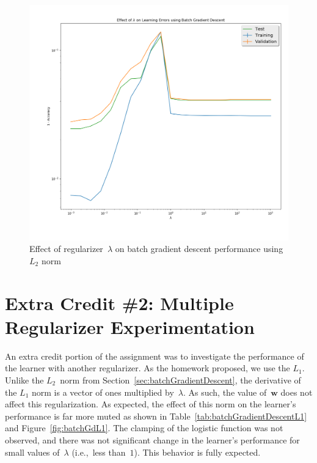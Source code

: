 \documentclass{report}
\newcommand{\w}{\mathbf{w}}
\begin{document}
  \begin{figure}
    \centering
    \includegraphics[scale=.3]{batch_GD_L2Norm}
    \caption{Effect of regularizer~$\lambda$ on batch gradient descent performance using $L_2$ norm}\label{fig:batchGdL2}
  \end{figure}
    
  \section{Extra Credit \#2: Multiple Regularizer Experimentation}

  An extra credit portion of the assignment was to investigate the performance of the learner with another regularizer.  As the homework proposed, we use the $L_1$.  Unlike the $L_2$~norm from Section~\ref{sec:batchGradientDescent}, the derivative of the $L_1$ norm is a vector of ones multiplied by~$\lambda$.  As such, the value of~$\w$ does not affect this regularization.  As expected, the effect of this norm on the learner's performance is far more muted as shown in Table~\ref{tab:batchGradientDescentL1} and Figure~\ref{fig:batchGdL1}.  The clamping of the logistic function was not observed, and there was not significant change in the learner's performance for small values of~$\lambda$ (i.e.,~less than~$1$).  This behavior is fully expected.
\end{document}
